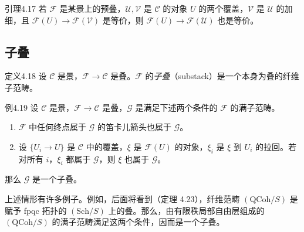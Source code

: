 \begin{origstatement}{引理}{4.17}\label{ch04:lem417}
若 $\mathcal F$ 是某景上的预叠，$\mathcal U,\mathcal V$ 是 $\mathcal C$ 的对象 $U$ 的两个覆盖，$\mathcal V$ 是 $\mathcal U$ 的加细，且 $\mathcal F(U)\to\mathcal F(\mathcal V)$ 是等价，则 $\mathcal F(U)\to\mathcal F(\mathcal U)$ 也是等价。
\end{origstatement}

\subsection{子叠}
\begin{origstatement}{定义}{4.18}\label{ch04:def418}
设 $\mathcal C$ 是景，$\mathcal F\to\mathcal C$ 是叠。$\mathcal F$ 的\emph{子叠}（substack）是一个本身为叠的纤维子范畴。
\end{origstatement}

\begin{origstatement}{例}{4.19}\label{ch04:ex419}
设 $\mathcal C$ 是景，$\mathcal F\to\mathcal C$ 是叠，$\mathcal G$ 是满足下述两个条件的 $\mathcal F$ 的满子范畴。
\begin{enumerate}
 \item[(i)] $\mathcal F$ 中任何终点属于 $\mathcal G$ 的笛卡儿箭头也属于 $\mathcal G$。
 \item[(ii)] 设 $\{U_i\to U\}$ 是 $\mathcal C$ 中的覆盖，$\xi$ 是 $\mathcal F(U)$ 的对象，$\xi_i$ 是 $\xi$ 到 $U_i$ 的拉回。若对所有 $i$，$\xi_i$ 都属于 $\mathcal G$，则 $\xi$ 也属于 $\mathcal G$。
\end{enumerate}
那么 $\mathcal G$ 是一个子叠。

上述情形有许多例子。例如，后面将看到（定理 4.23），纤维范畴 $(\mathrm{QCoh}/S)$ 是赋予 fpqc 拓扑的 $(\mathrm{Sch}/S)$ 上的叠。那么，由有限秩局部自由层组成的 $(\mathrm{QCoh}/S)$ 的满子范畴满足这两个条件，因而是一个子叠。
\end{origstatement}

